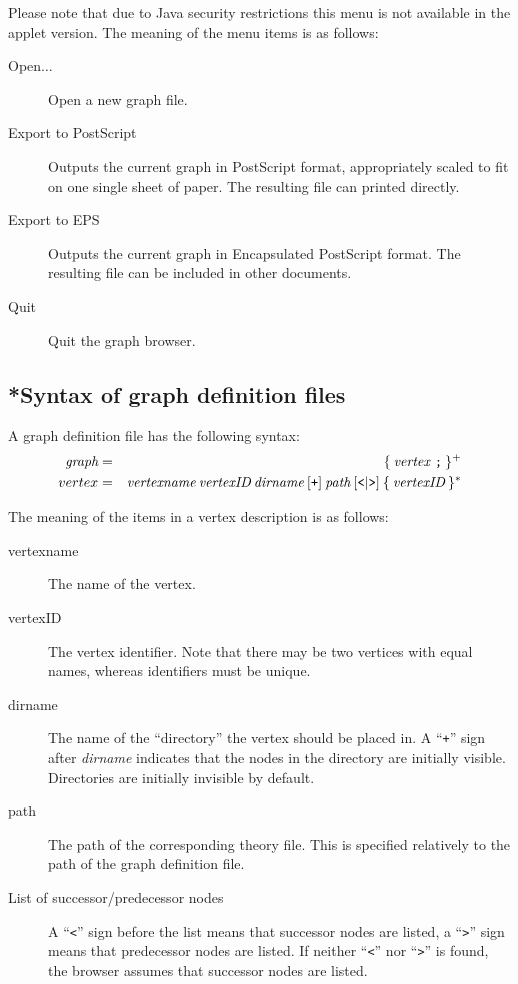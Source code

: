 Please note that due to Java security restrictions this menu is not
available in the applet version. The meaning of the menu items is as
follows:
\begin{description}
  
\item[Open$\ldots$] Open a new graph file.
  
\item[Export to PostScript] Outputs the current graph in {\sc
    PostScript} format, appropriately scaled to fit on one single
  sheet of paper.  The resulting file can printed directly.
  
\item[Export to EPS] Outputs the current graph in Encapsulated {\sc
    PostScript} format. The resulting file can be included in other
  documents.

\item[Quit] Quit the graph browser.

\end{description}


\subsection*{*Syntax of graph definition files}

A graph definition file has the following syntax:
\begin{eqnarray*}
  \mbox{\it graph} & = & \{ \: \mbox{\it vertex \tt ;} \: \} ^ + \\
  vertex & = & \mbox{\it vertexname} \: \mbox{\it vertexID} \: \mbox{\it dirname} \: [ \mbox{\tt +} ]
  \: \mbox{\it path} \: [ \mbox{\tt <} | \mbox{\tt >} ] \: \{ \: \mbox{\it vertexID} \: \} ^ *
\end{eqnarray*}

The meaning of the items in a vertex description is as follows:
\begin{description}
  
\item[vertexname] The name of the vertex.
  
\item[vertexID] The vertex identifier. Note that there may be two
  vertices with equal names, whereas identifiers must be unique.
  
\item[dirname] The name of the ``directory'' the vertex should be
  placed in.  A ``{\tt +}'' sign after {\it dirname} indicates that
  the nodes in the directory are initially visible. Directories are
  initially invisible by default.
  
\item[path] The path of the corresponding theory file. This is
  specified relatively to the path of the graph definition file.
  
\item[List of successor/predecessor nodes] A ``{\tt <}'' sign before
  the list means that successor nodes are listed, a ``{\tt >}'' sign
  means that predecessor nodes are listed. If neither ``{\tt <}'' nor
  ``{\tt >}'' is found, the browser assumes that successor nodes are
  listed.

\end{description}


